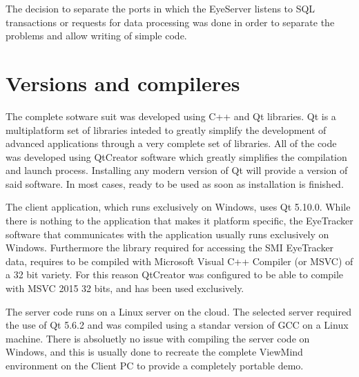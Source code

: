 \documentclass[a4paper,10pt]{article}
\begin{document}
The decision to separate the ports in which the EyeServer listens to SQL transactions or requests for data processing was done in order to separate the problems and allow writing of simple code. 

\section{Versions and compileres}
The complete sotware suit was developed using C++ and Qt libraries. Qt is a multiplatform set of libraries inteded to greatly simplify the development of advanced applications through a very complete set of libraries. All of the code was developed using QtCreator software which greatly simplifies the compilation and launch process. Installing any modern version of Qt will provide a version of said software. In most cases, ready to be used as soon as installation is finished.

The client application, which runs exclusively on Windows, uses Qt 5.10.0. While there is nothing to the application that makes it platform specific, the EyeTracker software that communicates with the application usually runs exclusively on Windows. Furthermore the library required for accessing the SMI EyeTracker data, requires to be compiled with Microsoft  Visual C++ Compiler (or MSVC) of a 32 bit variety. For this reason QtCreator was configured to be able to compile with MSVC 2015 32 bits, and has been used exclusively.

The server code runs on a Linux server on the cloud. The selected server required the use of Qt 5.6.2 and was compiled using a standar version of GCC on a Linux machine. There is absoluetly no issue with compiling the server code on Windows, and this is usually done to recreate the complete ViewMind environment on the Client PC to provide a completely portable demo.
\end{document}

